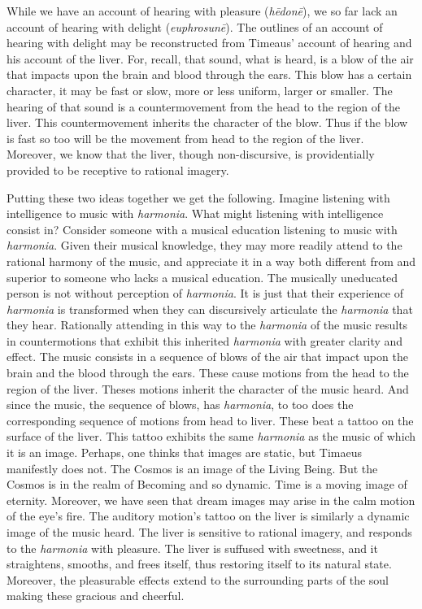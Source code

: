 While we have an account of hearing with pleasure (\emph{hēdonē}), we so far lack an account of hearing with delight (\emph{euphrosunē}). The outlines of an account of hearing with delight may be reconstructed from Timeaus' account of hearing and his account of the liver. For, recall, that sound, what is heard, is a blow of the air that impacts upon the brain and blood through the ears. This blow has a certain character, it may be fast or slow, more or less uniform, larger or smaller. The hearing of that sound is a countermovement from the head to the region of the liver. This countermovement inherits the character of the blow. Thus if the blow is fast so too will be the movement from head to the region of the liver. Moreover, we know that the liver, though non-discursive, is providentially provided to be receptive to rational imagery. 

Putting these two ideas together we get the following. Imagine listening with intelligence to music with \emph{harmonia}. What might listening with intelligence consist in? Consider someone with a musical education listening to music with \emph{harmonia}. Given their musical knowledge, they may more readily attend to the rational harmony of the music, and appreciate it in a way both different from and superior to someone who lacks a musical education. The musically uneducated person is not without perception of \emph{harmonia}. It is just that their experience of \emph{harmonia} is transformed when they can discursively articulate the \emph{harmonia} that they hear. Rationally attending in this way to the \emph{harmonia} of the music results in countermotions that exhibit this inherited \emph{harmonia} with greater clarity and effect. The music consists in a sequence of blows of the air that impact upon the brain and the blood through the ears. These cause motions from the head to the region of the liver. Theses motions inherit the character of the music heard. And since the music, the sequence of blows, has \emph{harmonia}, to too does the corresponding sequence of motions from head to liver. These beat a tattoo on the surface of the liver. This tattoo exhibits the same \emph{harmonia} as the music of which it is an image. Perhaps, one thinks that images are static, but Timaeus manifestly does not. The Cosmos is an image of the Living Being. But the Cosmos is in the realm of Becoming and so dynamic. Time is a moving image of eternity. Moreover, we have seen that dream images may arise in the calm motion of the eye's fire. The auditory motion's tattoo on the liver is similarly a dynamic image of the music heard. The liver is sensitive to rational imagery, and responds to the \emph{harmonia} with pleasure. The liver is suffused with sweetness, and it straightens, smooths, and frees itself, thus restoring itself to its natural state. Moreover, the pleasurable effects extend to the surrounding parts of the soul making these gracious and cheerful.

